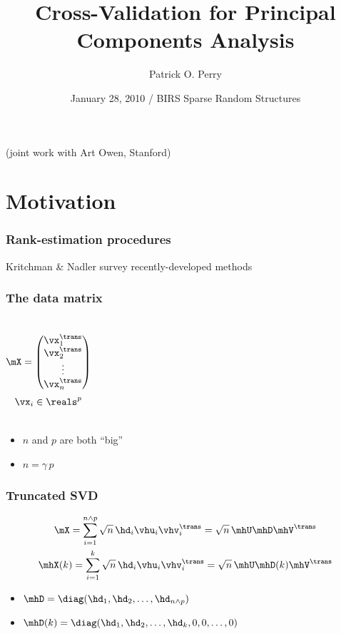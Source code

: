\documentclass[14pt]{beamer}
\title{Cross-Validation for Principal Components Analysis}
\author[P. O. Perry]{Patrick O. Perry}
\institute[Harvard University]
{
  Statistics and Information Sciences Laboratory\\
  Harvard University
}
\date[BIRS Workshop on Sparse Random Structures]
{January 28, 2010 / BIRS Sparse Random Structures}
\begin{document}
\begin{frame}
  \titlepage
  \hfill\small{(joint work with Art Owen, Stanford)}
\end{frame}


\section{Motivation}

\begin{frame}
  \frametitle{Rank-estimation procedures}
 
  Kritchman \& Nadler survey recently-developed methods
\end{frame}

\begin{frame}
  \frametitle{The data matrix}
  \begin{columns}[c]
    \[
      \mX
	=
	\left(
	\begin{matrix}
	  \vx_1^\trans \\
	  \vx_2^\trans \\
	  \vdots \\
	  \vx_n^\trans
	\end{matrix}
	\right)
    \]
    \[
      \vx_{i} \in \reals^p
    \]
  \end{columns}
  \begin{center}
    \begin{itemize}
      \item $n$ and $p$ are both ``big'' \\
      \item $n = \gamma \, p$
    \end{itemize}
  \end{center}
\end{frame}

\begin{frame}
  \frametitle{Truncated SVD}
  \begin{gather*}
    \mX = \sum_{i=1}^{n \wedge p} \sqrt{n} \, \hd_i \vhu_i \vhv_i^\trans = \sqrt{n} \, \mhU \mhD \mhV^\trans \\
    \mhX(k) = \sum_{i=1}^k \sqrt{n} \, \hd_i \vhu_i \vhv_i^\trans = \sqrt{n} \, \mhU \mhD(k) \mhV^\trans
  \end{gather*}

  \begin{itemize}
  \item $\mhD = \diag(\hd_1, \hd_2, \ldots, \hd_{n \wedge p})$
  \item $\mhD(k) = \diag(\hd_1, \hd_2, \ldots, \hd_k, 0, 0, \ldots, 0)$ 
  \end{itemize}
\end{frame}
\end{document}
